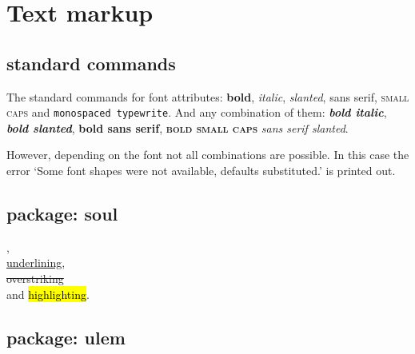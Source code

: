\section{Text markup}

\subsection{\latex{} standard commands}

\begin{filecontents*}{\democodefile}
The standard commands for font attributes:  
\textbf{bold}, \textit{italic}, \textsl{slanted},
\textsf{sans serif}, \textsc{small caps} and
\texttt{monospaced typewrite}.
And any combination of them:
\textit{\textbf{bold italic}},
\textsl{\textbf{bold slanted}},
\textsf{\textbf{bold sans serif}},
\textsc{\textbf{bold small caps}}
\textsl{\textsf{sans serif slanted}}. 
\end{filecontents*}

%
%
However, depending on the font not all combinations are possible.
In this case the error `Some font shapes were not available, 
defaults substituted.' is printed out.

\subsection{package: soul}

\begin{filecontents*}{\democodefile}
, \\
\ul{underlining},   \\
\st{overstriking}   \\
and \hl{highlighting}. 
\end{filecontents*}

%

\subsection{package: ulem}

